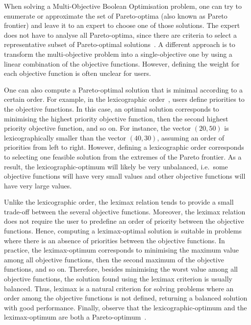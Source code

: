 \documentclass[a4paper,UKenglish,cleveref, autoref, thm-restate]{lipics-v2021}
\begin{document}
When solving a Multi-Objective Boolean Optimisation problem, one can try to enumerate or approximate the set of Pareto-optima (also known as Pareto frontier) and leave it to an expert to choose one of those solutions. The expert does not have to analyse all Pareto-optima, since there are criteria to select a representative subset of Pareto-optimal solutions~\cite{DBLP:journals/cor/GuerreiroMF21}.
A different approach is to transform the multi-objective problem into a single-objective one by using a linear combination of the objective functions. However, defining the weight for each objective function is often unclear for users.

One can also compute a Pareto-optimal solution that is minimal according to a certain order. For example, in the lexicographic order~\cite{BolLexiMarques-Silva2011}, users define priorities to the objective functions. In this case, an optimal solution corresponds to minimising the highest priority objective function, then the second highest priority objective function, and so on.
For instance, the vector $(20,50)$ is lexicographically smaller than the vector $(40, 30)$, assuming an order of priorities from left to right.
However, defining a lexicographic order corresponds to selecting one feasible solution from
the extremes of the Pareto frontier. As a result, the lexicographic-optimum will likely be very unbalanced, i.e.\ some objective functions will have very small values and other objective functions will have very large values. 

Unlike the lexicographic order, the leximax relation tends to provide a small trade-off between the several objective functions. Moreover, the leximax relation does not require the user to predefine an order of priority between the objective functions.
Hence, computing a leximax-optimal solution is suitable in problems where there is an absence of priorities between the objective functions.
In practice, the leximax-optimum corresponds to minimising the maximum value among all objective functions, then the second maximum of the objective functions, and so on.
Therefore, besides minimising the worst value among all objective functions, the solution found using the leximax criterion is usually balanced. Thus, leximax is a natural criterion for solving problems where an order among the objective functions is not defined, returning a balanced solution with good performance.
Finally, observe that the lexicographic-optimum and the leximax-optimum are both a Pareto-optimum~\cite{ehrgott}.
\end{document}
